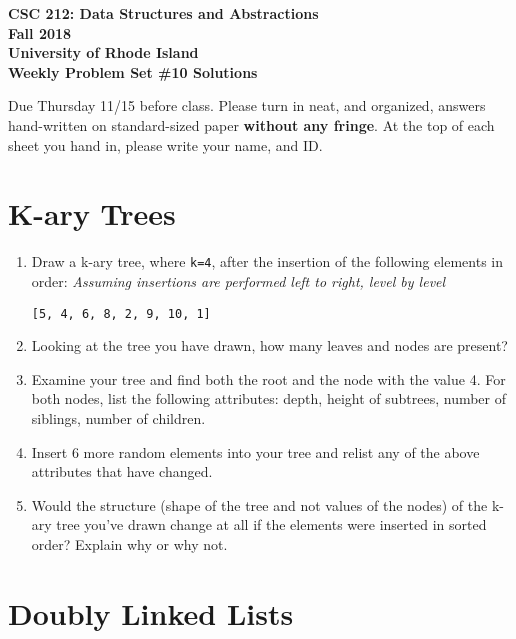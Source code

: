 \documentclass[11pt]{article}
\begin{document}
    \thispagestyle{empty}
    
    \begin{center}
        {\Large\bf CSC 212: Data Structures and Abstractions}\\
        \medskip
        {\Large\bf Fall 2018}\\
        \medskip
        {\Large\bf University of Rhode Island}\\
        \bigskip
        {\Large\bf Weekly Problem Set \#10 Solutions}
    \end{center}
    
    Due Thursday 11/15 before class. Please turn in neat, and organized, answers hand-written on standard-sized paper \textbf{without any fringe}. At the top of each sheet you hand in, please write your name, and ID.
    
    \section{K-ary Trees}
    \begin{enumerate}
        \item Draw a k-ary tree, where \verb|k=4|, after the insertion of the following elements in order: \emph{Assuming insertions are performed left to right, level by level}
        
        \verb|[5, 4, 6, 8, 2, 9, 10, 1]|
        
        \item Looking at the tree you have drawn, how many leaves and nodes are present?
        
        \item Examine your tree and find both the root and the node with the value 4. For both nodes, list the following attributes: depth, height of subtrees, number of siblings, number of children.
        
        \item Insert 6 more random elements into your tree and relist any of the above attributes that have changed.
        
        \item Would the structure (shape of the tree and not values of the nodes) of the k-ary tree you've drawn change at all if the elements were inserted in sorted order? Explain why or why not.
    \end{enumerate}
    
    \section{Doubly Linked Lists}
    
\end{document}
